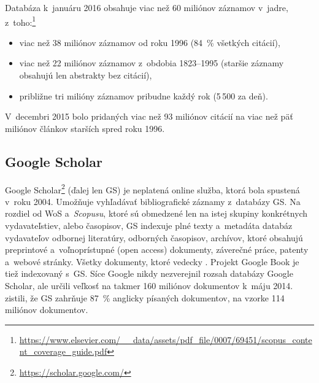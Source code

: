 Databáza k~januáru 2016 obsahuje viac než 60 miliónov záznamov v~jadre,
z~toho:\footnote{\url{https://www.elsevier.com/__data/assets/pdf_file/0007/69451/scopus_content_coverage_guide.pdf}}

\begin{itemize}
\item viac než 38 miliónov záznamov od roku 1996 (84~\% všetkých citácií),
\item viac než 22 miliónov záznamov z~obdobia 1823--1995 (staršie záznamy
  obsahujú len abstrakty bez citácií),
\item približne tri milióny záznamov pribudne každý rok (5\,500 za deň).
\end{itemize}

V~decembri 2015 bolo pridaných viac než 93 miliónov citácií na viac než päť
miliónov článkov starších spred roku 1996.

\subsection{Google Scholar}
\label{sec:gs}

Google Scholar\footnote{\url{https://scholar.google.com/}} (ďalej len GS) je
neplatená online služba, ktorá bola spustená v~roku 2004.  Umožňuje vyhľadávať
bibliografické záznamy z~databázy GS.  Na rozdiel od WoS a~\emph{Scopusu}, ktoré
sú obmedzené len na istej skupiny konkrétnych vydavateľstiev, alebo časopisov,
GS indexuje plné texty a~metadáta databáz vydavateľov odbornej literatúry,
odborných časopisov, archívov, ktoré obsahujú preprintové a~voľnoprístupné (open
access) dokumenty, záverečné práce, patenty a~webové stránky.  Všetky dokumenty,
ktoré  vedecky \citep{Vine2006}.  Projekt Google Book je tiež
indexovaný s~GS.  Síce Google nikdy nezverejnil rozsah databázy Google Scholar,
ale \citet{Orduna-Malea2015} určili veľkosť na takmer 160 miliónov dokumentov
k~máju 2014.  \citet{Khabsa2014} zistili, že GS zahrňuje 87~\% anglicky
písaných dokumentov, na vzorke 114 miliónov dokumentov.

